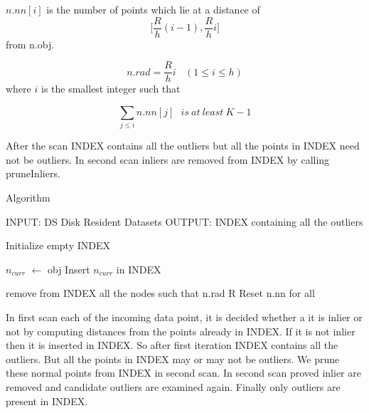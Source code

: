 $n.nn[i]$ is the number of points which lie at a distance of  \[ \bigg[   {\frac{R}{h}} (i-1) , {\frac{R}{h} } i \bigg] \]  from n.obj.

\[  n.rad = {\frac{R}{h}} i  \ \ \ \           (1 \leq i \leq h) \]
where $i$ is the smallest integer such that 

\[  \sum_{j \leq i} n.nn[j]  \ \ \      is \ at \ least \ K-1 \]



After the scan INDEX contains all the outliers but all the points in INDEX need not be outliers. In second scan inliers are removed from INDEX by calling pruneInliers.

\begin{algorithm}[H]
	\caption{Algorithm}
	\begin{algorithmic}
		\STATE  
		\STATE INPUT:  DS Disk Resident Datasets
		\STATE OUTPUT: INDEX containing all the outliers
		\STATE
		
		\STATE Initialize empty INDEX
		
		
			\STATE $n_{curr}$  $\leftarrow$ obj
				\STATE Insert $n_{curr}$ in INDEX
			\ENDIF
		
		\ENDFOR
	
	\STATE  remove from INDEX all the nodes such that n.rad  R
	\STATE  Reset n.nn for all
		
	\end{algorithmic}
\end{algorithm}

In first scan each of the incoming data point, it is decided whether a it is inlier or not by computing distances from the points already in INDEX. If it is not inlier then it is inserted in INDEX. So after first iteration INDEX contains all the outliers. But all the points in INDEX may or may not be outliers. We prune these normal points from INDEX in second scan. In second scan proved inlier are removed and candidate outliers are examined again.  Finally only outliers are present in INDEX.

